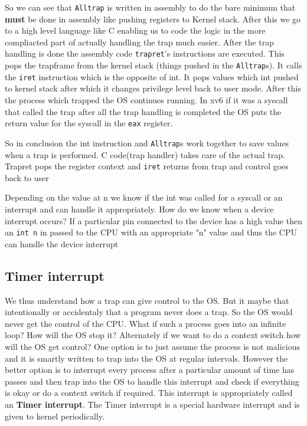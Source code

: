 \documentclass[12pt]{article}
\newcommand{\tbox}[1]{\noindent\fbox{\parbox{\textwidth}{#1}}}
\begin{document}
So we can see that \texttt{\texttt{Alltrap}} is written in assembly to do the bare minimum that \textbf{must} be done in assembly like pushing registers to Kernel stack. After this we go to a high level
language like C enabling us to code the logic in the more compliacted part of actually handling the trap much easier. 
After the trap handling is done the assembly code \texttt{trapret}'s instructions are executed. This pops the trapframe from the kernel stack (things pushed in the \texttt{Alltrap}s). It calls the \texttt{iret} instruction which is the opposite of int. It pops values which int pushed to kernel stack after which it changes privilege level back to user mode. After this the process which trapped the OS continues running. In xv6 if it was a syscall that called the trap after all the trap handling is completed the OS puts the return value for the 
syscall in the \texttt{eax} register.


So in conclusion the int instruction and \texttt{Alltrap}s work together to save values when a trap is performed. C code(trap handler) takes care of the actual trap. Trapret pops the register context and \texttt{iret} returns from trap and control goes back to user


Depending on the value at n we know if the int was called for a syscall or an interrupt and can handle it appropriately. How do we know when a device interrupt occurs?
If a particular pin connected to the device has a high value then an 
\texttt{int n} in passed to the CPU with an appropriate "n" value and thus the CPU can handle the device interrupt


\subsection{Timer interrupt}
\label{section:Timer}
We thus understand how a trap can give control to the OS. But it maybe that intentionally or accidentaly that a program never does a trap. So the OS would never get the control
of the CPU. What if such a process goes into an infinite loop? How will the OS stop it? Alternately if we want to do a context switch how will the OS get control? One option is to just assume the process
is not malicious and it is smartly written to trap into the OS at regular intervals. However the better option is to interrupt every process after a particular amount of time has passes and then 
trap into the OS to handle this interrupt and check if everything is okay or do a context switch if required. This interrupt is appropriately called an \textbf{Timer interrupt}. The Timer interrupt is a special hardware interrupt and is given to kernel periodically.
\newpage
\noindent\tbox{
    \begin{center}
    \textbf{\Huge Lecture 8}
    \end{center}
}
\end{document}
